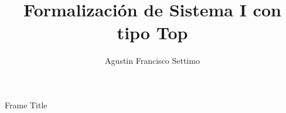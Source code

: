 \documentclass{beamer}
\title{Formalización de Sistema I con tipo Top}
\author{Agustin Francisco Settimo}
\date{}
\begin{document}
	
\begin{frame}[plain]
    \maketitle
\end{frame}

\begin{frame}{Frame Title}
	
\end{frame}
\end{document}
